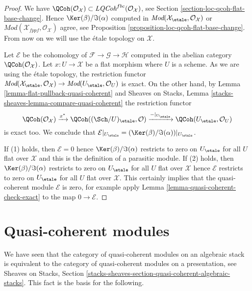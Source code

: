 \begin{proof}
We have $\QCoh(\mathcal{O}_\mathcal{X}) \subset
\textit{LQCoh}^{fbc}(\mathcal{O}_\mathcal{X})$, see
Section \ref{section-loc-qcoh-flat-base-change}.
Hence $\Ker(\beta)/\Im(\alpha)$ computed in
$\textit{Mod}(\mathcal{X}_\etale, \mathcal{O}_\mathcal{X})$ or
$\textit{Mod}(\mathcal{X}_{fppf}, \mathcal{O}_\mathcal{X})$ agree, see
Proposition \ref{proposition-loc-qcoh-flat-base-change}.
From now on we will use the \'etale topology on $\mathcal{X}$.

\medskip\noindent
Let $\mathcal{E}$ be the cohomology of
$\mathcal{F} \to \mathcal{G} \to \mathcal{H}$
computed in the abelian category $\QCoh(\mathcal{O}_\mathcal{X})$.
Let $x : U \to \mathcal{X}$ be a flat morphism where $U$ is a scheme.
As we are using the \'etale topology, the restriction functor
$\textit{Mod}(\mathcal{X}_\etale, \mathcal{O}_\mathcal{X})
\to \textit{Mod}(U_\etale, \mathcal{O}_U)$ is exact.
On the other hand, by Lemma \ref{lemma-flat-pullback-quasi-coherent} and
Sheaves on Stacks, Lemma \ref{stacks-sheaves-lemma-compare-quasi-coherent}
the restriction functor
$$
\QCoh(\mathcal{O}_\mathcal{X}) \xrightarrow{x^*}
\QCoh((\Sch/U)_\etale, \mathcal{O}) \xrightarrow{{-}|_{U_\etale}}
\QCoh(U_\etale, \mathcal{O}_U)
$$
is exact too. We conclude that
$\mathcal{E}|_{U_\etale} = (\Ker(\beta)/\Im(\alpha))|_{U_\etale}$.

\medskip\noindent
If (1) holds, then $\mathcal{E} = 0$ hence $\Ker(\beta)/\Im(\alpha)$
restricts to zero on $U_\etale$ for all $U$ flat over $\mathcal{X}$ and this
is the definition of a parasitic module. If (2) holds, then
$\Ker(\beta)/\Im(\alpha)$ restricts to zero on $U_\etale$ for all $U$
flat over $\mathcal{X}$ hence $\mathcal{E}$ restricts to zero on
$U_\etale$ for all $U$ flat over $\mathcal{X}$. This certainly implies
that the quasi-coherent module $\mathcal{E}$ is zero, for example apply
Lemma \ref{lemma-quasi-coherent-check-exact}
to the map $0 \to \mathcal{E}$.
\end{proof}





\section{Quasi-coherent modules}
\label{section-quasi-coherent}

\noindent
We have seen that the category of quasi-coherent modules on an algebraic
stack is equivalent to the category of quasi-coherent modules on a
presentation, see
Sheaves on Stacks, Section
\ref{stacks-sheaves-section-quasi-coherent-algebraic-stacks}.
This fact is the basis for the following.

